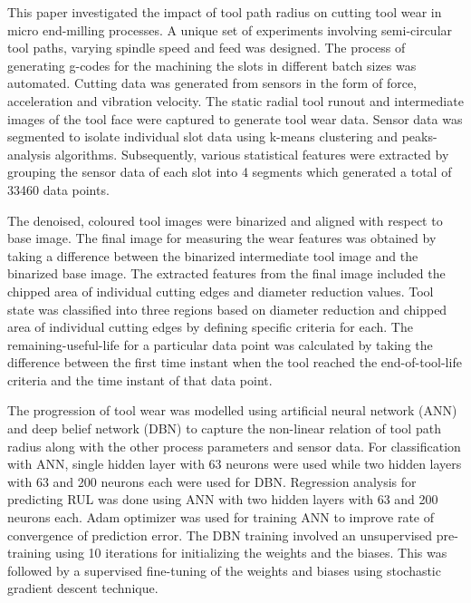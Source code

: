 \documentclass[preprint,review,12pt]{elsarticle}
\begin{document}
This paper investigated the impact of tool path radius on cutting tool wear in micro end-milling processes. A unique set of experiments involving semi-circular tool paths, varying spindle speed and feed was designed. The process of generating g-codes for the machining the slots in different batch sizes was automated. Cutting data was generated from sensors in the form of force, acceleration and vibration velocity. The static radial tool runout and intermediate images of the tool face were captured to generate tool wear data. Sensor data was segmented to isolate individual slot data using k-means clustering and peaks-analysis algorithms. Subsequently, various statistical features were extracted by grouping the sensor data of each slot into 4 segments which generated a total of 33460 data points. \par

The denoised, coloured tool images were binarized and aligned with respect to base image. The final image for measuring the wear features was obtained by taking a difference between the binarized intermediate tool image and the binarized base image. The extracted features from the final image included the chipped area of individual cutting edges and diameter reduction values. Tool state was classified into three regions based on diameter reduction and chipped area of individual cutting edges by defining specific criteria for each. The remaining-useful-life for a particular data point was calculated by taking the difference between the first time instant when the tool reached the end-of-tool-life criteria and the time instant of that data point. \par

The progression of tool wear was modelled using artificial neural network (ANN) and deep belief network (DBN) to capture the non-linear relation of tool path radius along with the other process parameters and sensor data. For classification with ANN, single hidden layer with 63 neurons were used while two hidden layers with 63 and 200 neurons each were used for DBN. Regression analysis for predicting RUL was done using ANN with two hidden layers with 63 and 200 neurons each. Adam optimizer was used for training ANN to improve rate of convergence of prediction error. The DBN training involved an unsupervised pre-training using 10 iterations for initializing the weights and the biases. This was followed by a supervised fine-tuning of the weights and biases using stochastic gradient descent technique. \par
\end{document}
